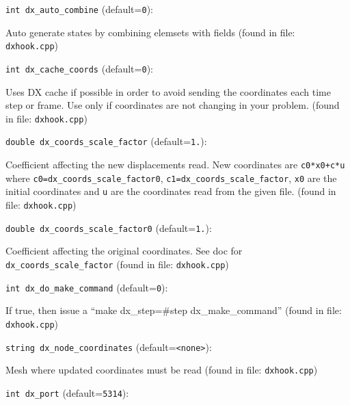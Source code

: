\item\verb+int dx_auto_combine+ {\rm(default=\verb|0|)}:

Auto generate states by combining elemsets with fields
 (found in file: \verb+dxhook.cpp+)
\item\verb+int dx_cache_coords+ {\rm(default=\verb|0|)}:

Uses DX cache if possible in order to avoid sending the coordinates
 each time step or frame. Use only if coordinates are not changing
 in your problem. 
 (found in file: \verb+dxhook.cpp+)
\item\verb+double dx_coords_scale_factor+ {\rm(default=\verb|1.|)}:

Coefficient affecting the new displacements read. 
 New coordinates are \verb|c0*x0+c*u| where
 \verb+c0=dx_coords_scale_factor0+, \verb+c1=dx_coords_scale_factor+,
 \verb+x0+ are the initial coordinates and \verb+u+ are the coordinates read
 from the given file. 
 (found in file: \verb+dxhook.cpp+)
\item\verb+double dx_coords_scale_factor0+ {\rm(default=\verb|1.|)}:

Coefficient affecting the original coordinates. See doc for
 \verb+dx_coords_scale_factor+
 (found in file: \verb+dxhook.cpp+)
\item\verb+int dx_do_make_command+ {\rm(default=\verb|0|)}:

If true, then issue a ``make dx_step=#step dx_make_command''
 (found in file: \verb+dxhook.cpp+)
\item\verb+string dx_node_coordinates+ {\rm(default=\verb|<none>|)}:

Mesh where updated coordinates must be read
 (found in file: \verb+dxhook.cpp+)
\item\verb+int dx_port+ {\rm(default=\verb|5314|)}:

